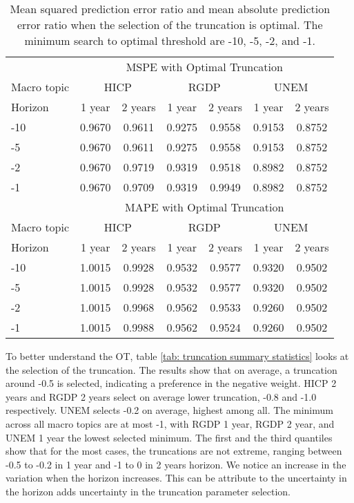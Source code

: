 \documentclass[11pt]{article}
\begin{document}
\begin{table}[!h]
	\centering
	\caption{Mean squared prediction error ratio and mean absolute prediction error ratio when the selection of the truncation is optimal. The minimum search to optimal threshold are -10, -5, -2, and -1.}
	\label{tab: oos mspe}
	\begin{tabular}{lcccccc}
		\hline
		&\multicolumn{6}{c}{MSPE with Optimal Truncation}\\
		\cmidrule(lr){2-7}
		Macro topic & \multicolumn{2}{c}{HICP} & \multicolumn{2}{c}{RGDP} & \multicolumn{2}{c}{UNEM} \\
		\cmidrule(lr){2-3} \cmidrule(lr){4-5}\cmidrule(lr){6-7}
		Horizon     & 1 year & 2 years & 1 year & 2 years & 1 year & 2 years \\ 
		\hline
		-10 & 0.9670   & 0.9611   & 0.9275   & 0.9558   & 0.9153   & 0.8752   \\ 
		-5  & 0.9670   & 0.9611   & 0.9275   & 0.9558   & 0.9153   & 0.8752   \\ 
		-2  & 0.9670   & 0.9719   & 0.9319   & 0.9518   & 0.8982   & 0.8752   \\ 
		-1  & 0.9670   & 0.9709   & 0.9319   & 0.9949   & 0.8982   & 0.8752   \\ 
		\hline
		&\multicolumn{6}{c}{MAPE with Optimal Truncation}\\
		\cmidrule(lr){2-7}
		Macro topic & \multicolumn{2}{c}{HICP} & \multicolumn{2}{c}{RGDP} & \multicolumn{2}{c}{UNEM} \\
		\cmidrule(lr){2-3} \cmidrule(lr){4-5}\cmidrule(lr){6-7}
		Horizon     & 1 year & 2 years & 1 year & 2 years & 1 year & 2 years \\ 
		\hline
		-10 & 1.0015   & 0.9928   & 0.9532   & 0.9577   & 0.9320   & 0.9502   \\
		-5  & 1.0015   & 0.9928   & 0.9532   & 0.9577   & 0.9320   & 0.9502   \\
		-2  & 1.0015   & 0.9968   & 0.9562   & 0.9533   & 0.9260   & 0.9502   \\
		-1  & 1.0015   & 0.9988   & 0.9562   & 0.9524   & 0.9260   & 0.9502   \\
		\hline
	\end{tabular}
\end{table}

To better understand the OT, table
\ref{tab: truncation summary statistics} looks at the selection of the
truncation. The results show that on average, a truncation around -0.5
is selected, indicating a preference in the negative weight. HICP
2 years and RGDP 2 years select on average lower truncation, -0.8 and
-1.0 respectively. UNEM selects -0.2 on average, highest among all. The
minimum across all macro topics are at most -1, with RGDP 1 year, RGDP 2
year, and UNEM 1 year the lowest selected minimum. The first and the
third quantiles show that for the most cases, the truncations are not
extreme, ranging between -0.5 to -0.2 in 1 year and -1 to 0 in 2 years
horizon. We notice an increase in the variation when the horizon
increases. This can be attribute to the uncertainty in the horizon adds
uncertainty in the truncation parameter selection.
\end{document}
